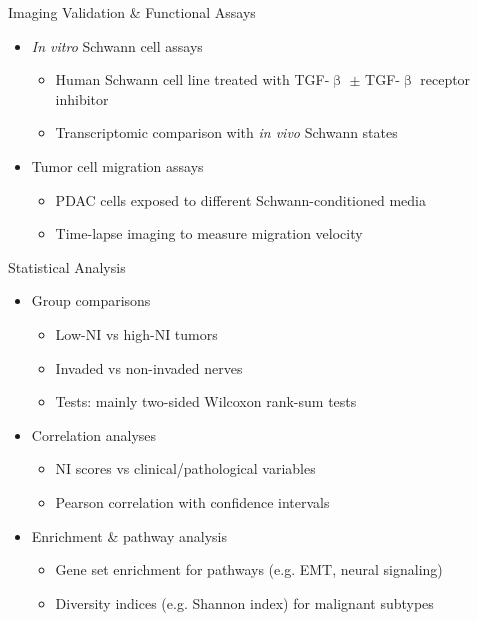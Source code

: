 \documentclass[10pt]{beamer}
\theoremstyle{plain}
\begin{document}
\begin{frame}{Imaging Validation \& Functional Assays}
  \begin{itemize}
    \item \textit{In vitro} Schwann cell assays
    \begin{itemize}
      \item Human Schwann cell line treated with TGF-\(\upbeta\)
            \(\pm\) TGF-\(\upbeta\) receptor inhibitor
      \item Transcriptomic comparison with \textit{in vivo} Schwann states
    \end{itemize}
    \item Tumor cell migration assays
    \begin{itemize}
      \item PDAC cells exposed to different Schwann-conditioned media
      \item Time-lapse imaging to measure migration velocity
    \end{itemize}
  \end{itemize}
\end{frame}

\begin{frame}{Statistical Analysis}
  \begin{itemize}
    \item Group comparisons
    \begin{itemize}
      \item Low-NI vs high-NI tumors
      \item Invaded vs non-invaded nerves
      \item Tests: mainly two-sided Wilcoxon rank-sum tests
    \end{itemize}
    \item Correlation analyses
    \begin{itemize}
      \item NI scores vs clinical/pathological variables
      \item Pearson correlation with confidence intervals
    \end{itemize}
    \item Enrichment \& pathway analysis
    \begin{itemize}
      \item Gene set enrichment for pathways (e.g. EMT, neural signaling)
      \item Diversity indices (e.g. Shannon index) for malignant subtypes
    \end{itemize}
  \end{itemize}
\end{frame}
\end{document}
